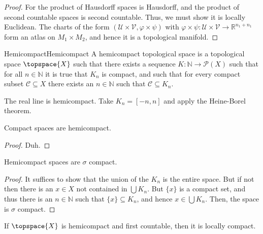 \documentclass{article}                                                        %
\begin{document}
        \begin{proof}
            For the product of Hausdorff spaces is Hausdorff, and the product
            of second countable spaces is second countable. Thus, we must show
            it is locally Euclidean. The charts of the form
            $(\mathcal{U}\times\mathcal{V},\varphi\times\psi)$ with
            $\varphi\times\psi:\mathcal{U}\times\mathcal{V}%
             \rightarrow\mathbb{R}^{n_{1}+n_{1}}$ form an atlas on
            $M_{1}\times{M}_{2}$, and hence it is a topological manifold.
        \end{proof}
        \begin{fdefinition}{Hemicompact}{Hemicompact}
            A hemicompact topological space is a topological space
            $\topspace{X}$ such that there exists a sequence
            $K:\mathbb{N}\rightarrow\mathcal{P}(X)$ such that for all
            $n\in\mathbb{N}$ it is true that $K_{n}$ is compact, and such that
            for every compact subset $\mathcal{C}\subseteq{X}$ there exists an
            $n\in\mathbb{N}$ such that $\mathcal{C}\subseteq{K}_{n}$.
        \end{fdefinition}
        \begin{example}
            The real line is hemicompact. Take $K_{n}=[\minus{n},n]$ and apply
            the Heine-Borel theorem.
        \end{example}
        \begin{theorem}
            Compact spaces are hemicompact.
        \end{theorem}
        \begin{proof}
            Duh.
        \end{proof}
        \begin{theorem}
            Hemicompact spaces are $\sigma$ compact.
        \end{theorem}
        \begin{proof}
            It suffices to show that the union of the $K_{n}$ is the entire
            space. But if not then there is an $x\in{X}$ not contained in
            $\bigcup{K}_{n}$. But $\{x\}$ is a compact set, and thus there is an
            $n\in\mathbb{N}$ such that $\{x\}\subseteq{K}_{n}$, and hence
            $x\in\bigcup{K}_{n}$. Then, the space is $\sigma$ compact.
        \end{proof}
        \begin{theorem}
            If $\topspace{X}$ is hemicompact and first countable, then it is
            locally compact.
        \end{theorem}
\end{document}
